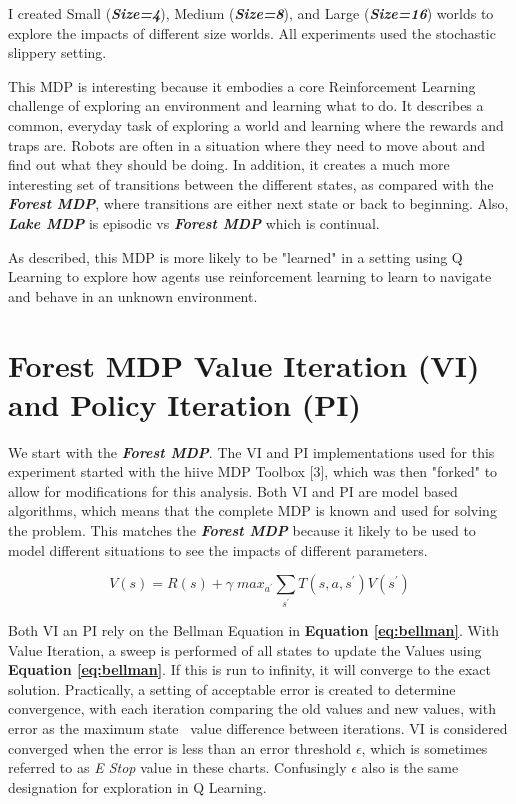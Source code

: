\documentclass[letterpaper]{article} %
\begin{document}
I created Small (\textbf{\emph{Size=4}}), Medium (\textbf{\emph{Size=8}}), and Large (\textbf{\emph{Size=16}}) worlds to explore the impacts of different size worlds.  All experiments used the stochastic slippery setting.

This MDP is interesting because it embodies a core Reinforcement Learning challenge of exploring an environment and learning what to do.  It describes a common, everyday task of exploring a world and learning where the rewards and traps are.  Robots are often in a situation where they need to move about and find out what they should be doing.  In addition, it creates a much more interesting set of transitions between the different states, as compared with the \textbf{\emph{Forest MDP}}, where transitions are either next state or back to beginning.  Also, \textbf{\emph{Lake MDP}} is episodic vs  \textbf{\emph{Forest MDP}} which is continual.

As described, this MDP is more likely to be "learned" in a setting using Q Learning to explore how agents use reinforcement learning to learn to navigate and behave in an unknown environment.

\section{Forest MDP Value Iteration (VI) and Policy Iteration (PI)}
We start with the \textbf{\emph{Forest MDP}}.   The VI and PI implementations used for this experiment started with the hiive MDP Toolbox [3], which was then "forked" to allow for modifications for this analysis.  Both VI and PI are model based algorithms, which means that the complete MDP is known and used for solving the problem.  This matches the \textbf{\emph{Forest MDP}} because it likely to be used to model different situations to see the impacts of different parameters.   


\begin{equation} 
\label{eq:bellman}
V(s) = R(s) + \gamma \; max_{a^\prime}  \sum_{s^\prime} T(s,a,s^\prime) V(s^\prime)
\end{equation}

Both VI an PI rely on the Bellman Equation  in  \textbf{Equation \ref{eq:bellman}}.  With Value Iteration, a sweep is performed of all states to update the Values using \textbf{Equation \ref{eq:bellman}}.  If this is run to infinity, it will converge to the exact solution.  Practically, a setting of acceptable error is created to determine convergence, with each iteration comparing the old values and new values, with error as the maximum state \ value difference between iterations. VI is considered converged when the error is less than an error threshold $\epsilon$, which is sometimes referred to as  \emph{E Stop} value in these charts.   Confusingly $\epsilon$ also is the same designation for exploration in Q Learning. 
\end{document}
